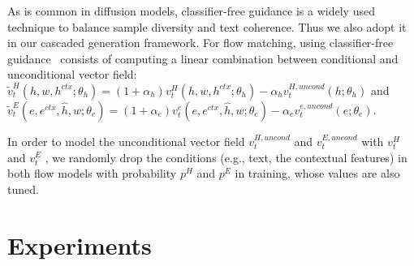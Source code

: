 As is common in diffusion models, classifier-free guidance is a widely used technique to balance sample diversity and text coherence. Thus we also adopt it in our cascaded generation framework. For flow matching, using classifier-free guidance~\cite{Zheng2023GuidedFF} consists of computing a linear combination between conditional and unconditional vector field: $\tilde{v}^{H}_t(h, w, h^{ctx};\theta_{h}) = (1 + \alpha_h)v^{H}_t(h, w, h^{ctx};\theta_h) - \alpha_h v^{H,uncond}_t(h;\theta_h)$ and $\tilde{v}^{E}_t(e,e^{ctx},\hat{h},w;\theta_{e}) = (1 + \alpha_e)v^{e}_t(e,e^{ctx},\hat{h},w;\theta_{e}) - \alpha_e v^{e,uncond}_t(e;\theta_e)$. 

In order to model the unconditional vector field $v_t^{H,uncond}$ and $v_t^{E,uncond}$ with $v_t^H$ and $v_t^E$ , we randomly drop the conditions (e.g., text, the contextual features) in both flow models with probability $p^{H}$ and $p^{E}$ in training, whose values are also tuned.

\section{Experiments}
\label{sec:exp}

\begin{table*}
\caption{Comparisons between MusicFlow with previous works in text-to-music generation on the MusicCaps dataset. }
\label{tab:main-result}
\begin{center}
\begin{sc}
\end{sc}
\end{center}
\end{table*}

